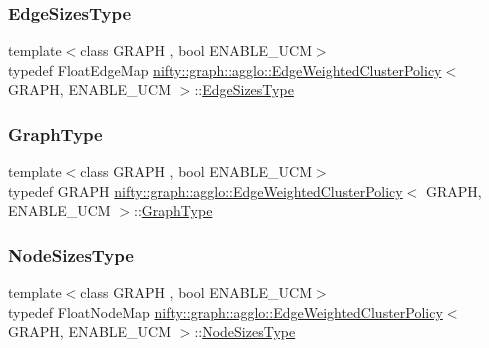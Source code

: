 \subsubsection{\texorpdfstring{Edge\+Sizes\+Type}{EdgeSizesType}}
{\footnotesize\ttfamily template$<$class G\+R\+A\+PH , bool E\+N\+A\+B\+L\+E\+\_\+\+U\+CM$>$ \\
typedef Float\+Edge\+Map \hyperlink{classnifty_1_1graph_1_1agglo_1_1EdgeWeightedClusterPolicy}{nifty\+::graph\+::agglo\+::\+Edge\+Weighted\+Cluster\+Policy}$<$ G\+R\+A\+PH, E\+N\+A\+B\+L\+E\+\_\+\+U\+CM $>$\+::\hyperlink{classnifty_1_1graph_1_1agglo_1_1EdgeWeightedClusterPolicy_a64d646cc14e503e9a76a4646234d9754}{Edge\+Sizes\+Type}}

\mbox{\label{classnifty_1_1graph_1_1agglo_1_1EdgeWeightedClusterPolicy_a8e910f7b9d0c1baa1de7b6b1c3e58397}} 
\subsubsection{\texorpdfstring{Graph\+Type}{GraphType}}
{\footnotesize\ttfamily template$<$class G\+R\+A\+PH , bool E\+N\+A\+B\+L\+E\+\_\+\+U\+CM$>$ \\
typedef G\+R\+A\+PH \hyperlink{classnifty_1_1graph_1_1agglo_1_1EdgeWeightedClusterPolicy}{nifty\+::graph\+::agglo\+::\+Edge\+Weighted\+Cluster\+Policy}$<$ G\+R\+A\+PH, E\+N\+A\+B\+L\+E\+\_\+\+U\+CM $>$\+::\hyperlink{classnifty_1_1graph_1_1agglo_1_1EdgeWeightedClusterPolicy_a8e910f7b9d0c1baa1de7b6b1c3e58397}{Graph\+Type}}

\mbox{\label{classnifty_1_1graph_1_1agglo_1_1EdgeWeightedClusterPolicy_a44ba54059efcb57c8c8091016fb9ee99}} 
\subsubsection{\texorpdfstring{Node\+Sizes\+Type}{NodeSizesType}}
{\footnotesize\ttfamily template$<$class G\+R\+A\+PH , bool E\+N\+A\+B\+L\+E\+\_\+\+U\+CM$>$ \\
typedef Float\+Node\+Map \hyperlink{classnifty_1_1graph_1_1agglo_1_1EdgeWeightedClusterPolicy}{nifty\+::graph\+::agglo\+::\+Edge\+Weighted\+Cluster\+Policy}$<$ G\+R\+A\+PH, E\+N\+A\+B\+L\+E\+\_\+\+U\+CM $>$\+::\hyperlink{classnifty_1_1graph_1_1agglo_1_1EdgeWeightedClusterPolicy_a44ba54059efcb57c8c8091016fb9ee99}{Node\+Sizes\+Type}}

